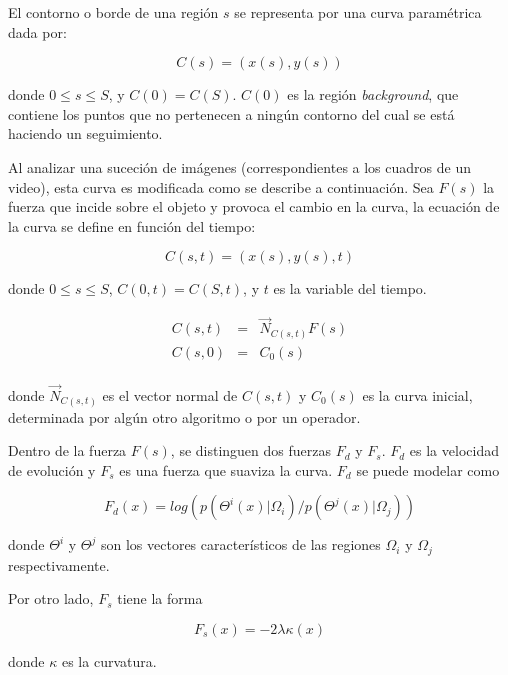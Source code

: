 \documentclass[a4paper,10pt]{article}
\begin{document}
El contorno o borde de una región $s$ se representa por una curva paramétrica
dada por:

\begin{equation}
    C(s) = (x(s), y(s))
\end{equation}

donde $0 \leq s \leq S$, y $C(0) = C(S)$. $C(0)$ es la región
\textit{background}, que contiene los puntos que no pertenecen a ningún
contorno del cual se está haciendo un seguimiento.

Al analizar una suceción de imágenes (correspondientes a los cuadros de un
video), esta curva es modificada como se describe a continuación. Sea $F(s)$ la
fuerza que incide sobre el objeto y provoca el cambio en la curva, la ecuación
de la curva se define en función del tiempo:

\begin{equation}
    C(s,t) = (x(s), y(s), t)
\end{equation}

donde $0 \leq s \leq S$, $C(0,t) = C(S,t)$, y $t$ es la variable del tiempo.

\begin{eqnarray}
    C(s,t) &=& \overrightarrow{N}_{C(s,t)}F(s)\\
    C(s,0) &=& C_{0}(s)\\
\end{eqnarray}

donde $\overrightarrow{N}_{C(s,t)}$ es el vector normal de $C(s,t)$ y $
C_{0}(s)$ es la curva inicial, determinada por algún otro algoritmo o por un
operador.

Dentro de la fuerza $F(s)$, se distinguen dos fuerzas $F_{d}$ y $F_{s}$.
$F_{d}$ es la velocidad de evolución y $F_{s}$ es una fuerza que suaviza la
curva. $F_{d}$ se puede modelar como

\begin{equation}
    F_{d}(x) = log(p(\Theta^{i}(x) | \Omega_{i}) / p(\Theta^{j}(x) | \Omega_{j}))
\end{equation}

donde $\Theta^{i}$ y $\Theta^{j}$ son los vectores característicos de las
regiones $\Omega_{i}$ y $\Omega_{j}$ respectivamente.

Por otro lado, $F_{s}$ tiene la forma

\begin{equation}
    \label{eq:active-contours-fs}
    F_{s}(x) = -2\lambda\kappa(x)
\end{equation}

donde $\kappa$ es la curvatura.
\end{document}
